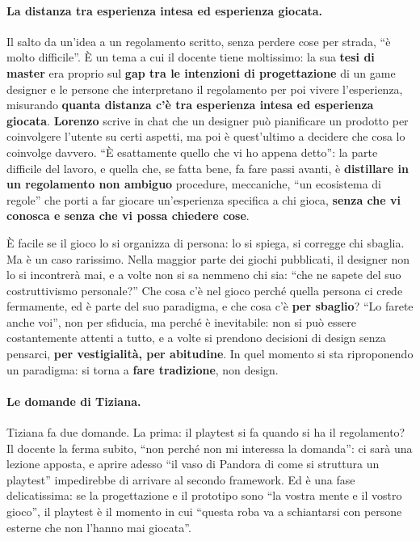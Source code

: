 \paragraph{La distanza tra esperienza intesa ed esperienza giocata.} Il salto da
un'idea a un regolamento scritto, senza perdere cose per strada, ``è molto
difficile''. È un tema a cui il docente tiene moltissimo: la sua \textbf{tesi di
master} era proprio sul \textbf{gap tra le intenzioni di progettazione} di un
game designer e le persone che interpretano il regolamento per poi vivere
l'esperienza, misurando \textbf{quanta distanza c'è tra esperienza intesa ed
esperienza giocata}. \textbf{Lorenzo} scrive in chat che un designer può
pianificare un prodotto per coinvolgere l'utente su certi aspetti, ma poi è
quest'ultimo a decidere che cosa lo coinvolge davvero. ``È esattamente quello
che vi ho appena detto'': la parte difficile del lavoro, e quella che, se fatta
bene, fa fare passi avanti, è \textbf{distillare in un regolamento non ambiguo}
procedure, meccaniche, ``un ecosistema di regole'' che porti a far giocare
un'esperienza specifica a chi gioca, \textbf{senza che vi conosca e senza che vi
possa chiedere cose}.

È facile se il gioco lo si organizza di persona: lo si spiega, si corregge chi
sbaglia. Ma è un caso rarissimo. Nella maggior parte dei giochi pubblicati, il
designer non lo si incontrerà mai, e a volte non si sa nemmeno chi sia: ``che ne
sapete del suo costruttivismo personale?'' Che cosa c'è nel gioco perché quella
persona ci crede fermamente, ed è parte del suo paradigma, e che cosa c'è
\textbf{per sbaglio}? ``Lo farete anche voi'', non per sfiducia, ma perché è
inevitabile: non si può essere costantemente attenti a tutto, e a volte si
prendono decisioni di design senza pensarci, \textbf{per vestigialità, per
abitudine}. In quel momento si sta riproponendo un paradigma: si torna a
\textbf{fare tradizione}, non design.

\paragraph{Le domande di Tiziana.} Tiziana fa due domande. La prima: il playtest
si fa quando si ha il regolamento? Il docente la ferma subito, ``non perché non
mi interessa la domanda'': ci sarà una lezione apposta, e aprire adesso ``il vaso
di Pandora di come si struttura un playtest'' impedirebbe di arrivare al secondo
framework. Ed è una fase delicatissima: se la progettazione e il prototipo sono
``la vostra mente e il vostro gioco'', il playtest è il momento in cui ``questa
roba va a schiantarsi con persone esterne che non l'hanno mai giocata''.

